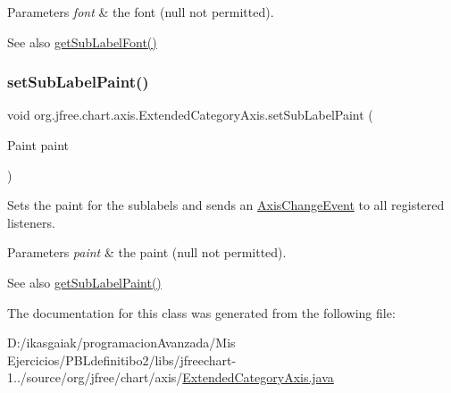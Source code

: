 \begin{DoxyParams}{Parameters}
{\em font} & the font ({\ttfamily null} not permitted).\\
\hline
\end{DoxyParams}
\begin{DoxySeeAlso}{See also}
\mbox{\hyperlink{classorg_1_1jfree_1_1chart_1_1axis_1_1_extended_category_axis_a0b167c7b8149bdaa6f608d0bd2fea7b9}{get\+Sub\+Label\+Font()}} 
\end{DoxySeeAlso}
\mbox{\label{classorg_1_1jfree_1_1chart_1_1axis_1_1_extended_category_axis_a25d5fdb730377e92220fbd36cc4f274d}} 
\subsubsection{\texorpdfstring{set\+Sub\+Label\+Paint()}{setSubLabelPaint()}}
{\footnotesize\ttfamily void org.\+jfree.\+chart.\+axis.\+Extended\+Category\+Axis.\+set\+Sub\+Label\+Paint (\begin{DoxyParamCaption}\item[{Paint}]{paint }\end{DoxyParamCaption})}

Sets the paint for the sublabels and sends an \mbox{\hyperlink{}{Axis\+Change\+Event}} to all registered listeners.


\begin{DoxyParams}{Parameters}
{\em paint} & the paint ({\ttfamily null} not permitted).\\
\hline
\end{DoxyParams}
\begin{DoxySeeAlso}{See also}
\mbox{\hyperlink{classorg_1_1jfree_1_1chart_1_1axis_1_1_extended_category_axis_a1aece6e248db92354b6a61e3af1c1e57}{get\+Sub\+Label\+Paint()}} 
\end{DoxySeeAlso}


The documentation for this class was generated from the following file\+:\begin{DoxyCompactItemize}
\item 
D\+:/ikasgaiak/programacion\+Avanzada/\+Mis Ejercicios/\+P\+B\+Ldefinitibo2/libs/jfreechart-\/1../source/org/jfree/chart/axis/\mbox{\hyperlink{_extended_category_axis_8java}{Extended\+Category\+Axis.\+java}}\end{DoxyCompactItemize}

